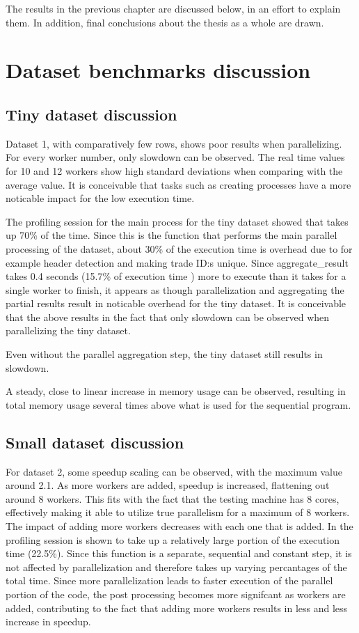 The results in the previous chapter are discussed below, in an effort to explain them. In addition, final conclusions
about the thesis as a whole are drawn.

\section{Dataset benchmarks discussion}
\subsection{Tiny dataset discussion}
Dataset 1, with comparatively few rows, shows poor results when parallelizing. For every worker number, only slowdown can be observed.
The real time values for 10 and 12 workers show high standard deviations when comparing with the average value. It is conceivable that
tasks such as creating processes have a more noticable impact for the low execution time.

The profiling session for the main process for the tiny dataset showed that  takes up 70\% of the time. Since this is the function
that performs the main parallel processing of the dataset, about 30\% of the execution time is overhead due to for example header detection
and making trade ID:s unique. Since aggregate\_result takes 0.4 seconds (15.7\% of execution time ) more to execute than it takes for a single worker to finish,
it appears as though parallelization and aggregating the partial results result in noticable overhead for the tiny dataset.
It is conceivable that the above results in the fact that only slowdown can be observed when parallelizing the tiny dataset.

Even without the parallel aggregation step, the tiny dataset still results in slowdown.

A steady, close to linear increase in memory usage can be observed, resulting in total memory usage several times above what is
used for the sequential program.

\subsection{Small dataset discussion}
For dataset 2, some speedup scaling can be observed, with the maximum value around 2.1. As more workers are added, speedup is increased,
flattening out around 8 workers. This fits with the fact that the testing machine has 8 cores, effectively making it able to utilize 
true parallelism for a maximum of 8 workers. The impact of adding more workers decreases with each one that is added. In the profiling session
 is shown to take up a relatively large portion of the execution time (22.5\%). Since this function is a separate,
sequential and constant step, it is not affected by parallelization and therefore takes up varying percantages of the total time. Since more parallelization
leads to faster execution of the parallel portion of the code, the post processing becomes more signifcant as workers are added, contributing to the fact
that adding more workers results in less and less increase in speedup.

